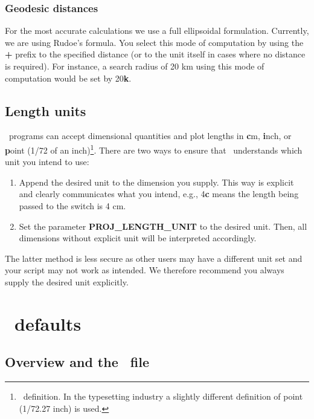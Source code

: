\subsubsection{Geodesic distances}
For the most accurate calculations we use a full ellipsoidal formulation.  Currently,
we are using Rudoe's formula.  You select this mode of computation by using the \textbf{+} prefix to
the specified distance (or to the unit itself in cases where no distance is required).
For instance, a search radius of 20 km using this mode of computation would be set by 20\textbf{k}.

\subsection{Length units}

\GMT\ programs can accept dimensional quantities and plot lengths
in \textbf{c}m, \textbf{i}nch,
or \textbf{p}oint (1/72 of an inch)\footnote{\PS\ definition.
In the typesetting industry a slightly different definition of point
(1/72.27 inch) is used.}.  There are two ways to ensure that \GMT\ understands
which unit you intend to use:

\begin{enumerate}
\item Append the desired unit to the dimension you supply.  This
way is explicit and clearly communicates what you intend, e.g.,
4\textbf{c} means the length being passed to the  switch is 4 cm.

\item Set the parameter \textbf{PROJ\_LENGTH\_UNIT} to the desired unit.  Then, all
dimensions without explicit unit will be interpreted accordingly.

\end{enumerate}
The latter method is less secure as other users may have a different unit
set and your script may not work as intended.  We therefore recommend
you always supply the desired unit explicitly.

\section{\gmt\ defaults}
\label{sec:gmt.conf}
\subsection{Overview and the \protect{}\ file}

